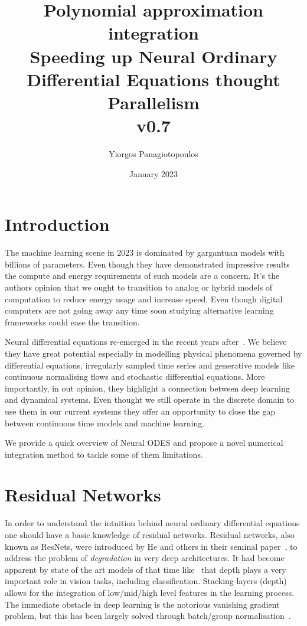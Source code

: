 \documentclass{article}
\title{Polynomial approximation integration  \\ \large{Speeding up Neural Ordinary Differential Equations thought Parallelism} \\ v0.7}
\author{Yiorgos Panagiotopoulos}
\date{January 2023}
\begin{document}
    \maketitle

    \section{Introduction}
    The machine learning scene in 2023 is dominated by gargantuan models with billions of parameters.
    Even though they have demonstrated impressive results the compute and energy requirements of such models are a
    concern.
    It's the authors opinion that we ought to transition to analog or hybrid models of computation to reduce energy
    usage and increase speed.
    Even though digital computers are not going away any time soon studying alternative learning frameworks could ease
    the transition.

    Neural differential equations re-emerged in the recent years after~\cite{chen2018neural}.
    We believe they have great potential especially in modelling physical phenomena governed by differential equations,
    irregularly sampled time series and generative models like continuous normalising flows and stochastic differential
    equations.
    More importantly, in out opinion, they highlight a connection between deep learning and dynamical systems.
    Even thought we still operate in the discrete domain to use them in our current systems they offer an opportunity
    to close the gap between continuous time models and machine learning.

    We provide a quick overview of Neural ODES and propose a novel numerical integration method to tackle some of
    them limitations.


    \section{Residual Networks}
    In order to understand the intuition behind neural ordinary differential equations one should have a basic knowledge
    of residual networks.
    Residual networks, also known as ResNets, were introduced by He and others in their seminal
    paper~\cite{He_2016_CVPR}, to address the problem of \textit{degradation} in very deep architectures.
    It had become apparent by state of the art models of that time like~\cite{simonyan2014very} that depth plays a very
    important role in vision tasks, including classification.
    Stacking layers (depth) allows for the integration of low/mid/high level features in the learning process.
    The immediate obstacle in deep learning is the notorious vanishing gradient problem, but this has been largely
    solved through batch/group normalisation~\cite{ioffe2015batch}.
\end{document}
